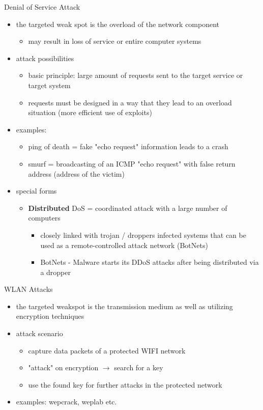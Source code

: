 \documentclass[11pt]{article}
\begin{document}
Denial of Service Attack
\begin{itemize}
\item the targeted weak spot is the overload of the network component
\begin{itemize}
\item may result in loss of service or entire computer systems
\end{itemize}
\item attack possibilities
\begin{itemize}
\item basic principle: large amount of requests sent to the target service or target system
\item requests must be designed in a way that they lead to an overload situation (more efficient use of exploits)
\end{itemize}
\item examples:
\begin{itemize}
\item ping of death = fake "echo request" information leads to a crash
\item smurf = broadcasting of an ICMP "echo request" with false return address (address of the victim)
\end{itemize}
\item special forms
\begin{itemize}
\item \textbf{Distributed} DoS = coordinated attack with a large number of computers
\begin{itemize}
\item closely linked with trojan / droppers infected systems that can be used as a remote-controlled attack network (BotNets)
\item BotNets - Malware starts its DDoS attacks after being distributed via a dropper
\end{itemize}
\end{itemize}
\end{itemize}

WLAN Attacks
\begin{itemize}
\item the targeted weakspot is the transmission medium as well as utilizing encryption techniques
\item attack scenario
\begin{itemize}
\item capture data packets of a protected WIFI network
\item "attack" on encryption \(\rightarrow\) search for a key
\item use the found key for further attacks in the protected network
\end{itemize}
\item examples: wepcrack, weplab etc.
\end{itemize}
\end{document}
